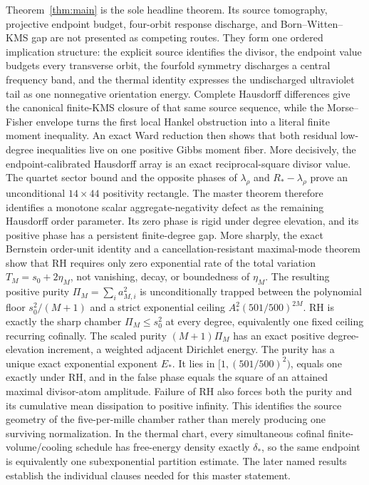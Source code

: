 \documentclass[11pt]{article}
\begin{document}
Theorem~\ref{thm:main} is the sole headline theorem.  Its source tomography, projective endpoint
budget, four-orbit response discharge, and Born--Witten--KMS gap are not presented as competing
routes.  They form one ordered implication structure: the explicit source identifies the divisor,
the endpoint value budgets every transverse orbit, the fourfold symmetry discharges a central
frequency band, and the thermal identity expresses the undischarged ultraviolet tail as one
nonnegative orientation energy.  Complete Hausdorff differences give the canonical finite-KMS
closure of that same source sequence, while the Morse--Fisher envelope turns the first local
Hankel obstruction into a literal finite moment inequality.  An exact Ward reduction then shows
that both residual low-degree inequalities live on one positive Gibbs moment fiber.  More
decisively, the endpoint-calibrated Hausdorff array is an exact reciprocal-square divisor value.
The quartet sector bound and the opposite phases of $\lambda_\rho$ and $R_*-\lambda_\rho$ prove
an unconditional $14\times44$ positivity rectangle.  The master theorem therefore identifies a
monotone scalar aggregate-negativity defect as the remaining Hausdorff order parameter.
Its zero phase is rigid under degree elevation, and its positive phase has a persistent
finite-degree gap.  More sharply, the exact Bernstein order-unit identity and a
cancellation-resistant maximal-mode theorem show that RH requires only zero exponential rate of
the total variation $T_M=s_0+2\eta_M$, not vanishing, decay, or boundedness of $\eta_M$.
The resulting positive purity $\Pi_M=\sum_i a_{M,i}^2$ is unconditionally trapped between the
polynomial floor $s_0^2/(M+1)$ and a strict exponential ceiling
$A_*^2(501/500)^{2M}$.  RH is exactly the sharp chamber $\Pi_M\le s_0^2$ at every degree, equivalently
one fixed ceiling recurring cofinally.  The scaled purity $(M+1)\Pi_M$ has an exact positive
degree-elevation increment, a weighted adjacent Dirichlet energy.  The purity has a unique exact
exponential exponent $E_*$.  It lies in $[1,(501/500)^2)$, equals one exactly under RH, and in
the false phase equals the square of an attained maximal divisor-atom amplitude.  Failure of RH
also forces both the purity and its cumulative mean dissipation to positive infinity.  This
identifies the source geometry of the five-per-mille chamber rather than merely producing one
surviving normalization.
In the thermal chart, every simultaneous cofinal finite-volume/cooling schedule
has free-energy density exactly $\delta_*$, so the same endpoint is equivalently one
subexponential partition estimate.  The later named results establish the individual clauses
needed for this master statement.
\end{document}
